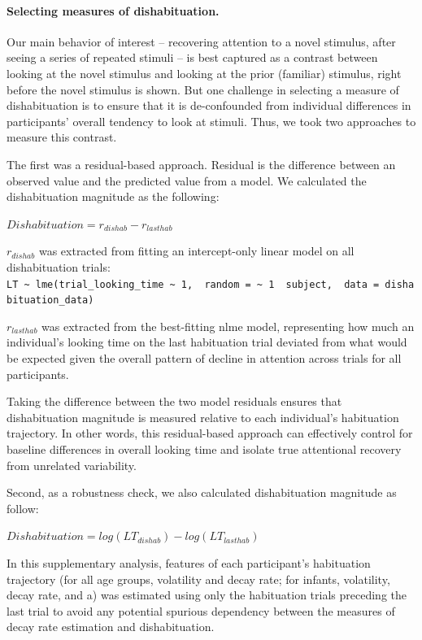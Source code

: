 \documentclass[10pt, letterpaper]{article}
\begin{document}
\hypertarget{selecting-measures-of-dishabituation.}{%
\paragraph{Selecting measures of
dishabituation.}\label{selecting-measures-of-dishabituation.}}

Our main behavior of interest -- recovering attention to a novel
stimulus, after seeing a series of repeated stimuli -- is best captured
as a contrast between looking at the novel stimulus and looking at the
prior (familiar) stimulus, right before the novel stimulus is shown. But
one challenge in selecting a measure of dishabituation is to ensure that
it is de-confounded from individual differences in participants' overall
tendency to look at stimuli. Thus, we took two approaches to measure
this contrast.

The first was a residual-based approach. Residual is the difference
between an observed value and the predicted value from a model. We
calculated the dishabituation magnitude as the following:

\(Dishabituation = r_{dishab} - r_{lasthab}\)

\(r_{dishab}\) was extracted from fitting an intercept-only linear model
on all dishabituation trials:
\texttt{LT\ \textasciitilde{}\ lme(trial\_looking\_time\ \textasciitilde{}\ 1,\ \ random\ =\ \textasciitilde{}\ 1\ \textbar{}\ subject,\ \ data\ =\ dishabituation\_data)}

\(r_{lasthab}\) was extracted from the best-fitting nlme model,
representing how much an individual's looking time on the last
habituation trial deviated from what would be expected given the overall
pattern of decline in attention across trials for all participants.

Taking the difference between the two model residuals ensures that
dishabituation magnitude is measured relative to each individual's
habituation trajectory. In other words, this residual-based approach can
effectively control for baseline differences in overall looking time and
isolate true attentional recovery from unrelated variability.

Second, as a robustness check, we also calculated dishabituation
magnitude as follow:

\(Dishabituation = log(LT_{dishab}) - log(LT_{lasthab})\)

In this supplementary analysis, features of each participant's
habituation trajectory (for all age groups, volatility and decay rate;
for infants, volatility, decay rate, and a) was estimated using only the
habituation trials preceding the last trial to avoid any potential
spurious dependency between the measures of decay rate estimation and
dishabituation.
\end{document}
